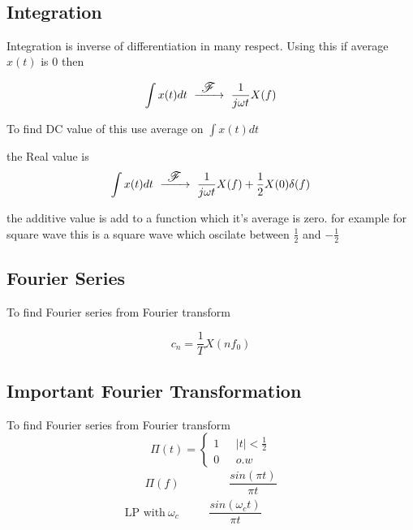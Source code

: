 ~\vspace{-2.5em}
\newcommand{\FourierTransform}{~ \xrightarrow{ \text{\large $~\mathscr{F}~$}} ~}
\subsection{Integration}
Integration is inverse of differentiation in many respect. Using this if average $x(t)$ is 0 then

\begin{equation}
\int x(t) dt \FourierTransform \frac{1}{j \omega t} X(f)
\end{equation}

To find DC value of this use average on $ \int x(t) dt $

the Real value is 
\begin{equation}
\int x(t) dt \FourierTransform \frac{1}{j \omega t} X(f) + \frac{1}{2}X(0)\delta(f)
\end{equation}

the additive value is add to a function which it's average is zero. for example for square wave this is a square wave which oscilate between $\frac{1}{2}$ and $-\frac{1}{2}$

\subsection{Fourier Series}
To find Fourier series from Fourier transform

\begin{equation}
c_n = \frac{1}{T} X(n f_0)
\end{equation}

\subsection{Important Fourier Transformation}
To find Fourier series from Fourier transform
$$\Pi (t) = 
\left\{
	\begin{array}{ll}
		1  & \mbox{ } |t|<\frac{1}{2} \\
		0 & \mbox{ } o.w
	\end{array}
\right.
$$
$$
\renewcommand{\arraystretch}{3}
	\begin{array}{cc}
		~~~~~~~~\Pi(f)~~~~~~~~   & ~~~~~~~~\dfrac{sin(\pi t)}{\pi t}~~~~~~~~ \\
		\text{LP~with}~\omega_c & \dfrac{sin(\omega_c t)}{\pi t}
	\end{array}
$$

~\\
